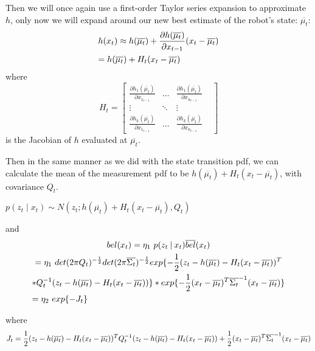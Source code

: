 Then we will once again use a first-order Taylor series expansion to approximate \(h\), only now we will expand around our new best estimate of the robot's state: \(\overline{\mu_t}\):
\begin{multline}
h(x_t) \approx h(\overline{\mu_t}) + \frac{\partial h(\overline{\mu_t})}{\partial x_{t-1}} (x_t - \overline{\mu_t}) \\
= h(\overline{\mu_t}) + H_t (x_t - \overline{\mu_t}) \hfill
\end{multline}
where \[
H_t = \begin{bmatrix} 
\frac{\partial h_1(\overline{\mu_t})}{\partial x_{1_{t-1}}} & \dots & \frac{\partial h_1(\overline{\mu_t})}{\partial x_{n_{t-1}}}\\
\vdots & \ddots & \vdots & \\
\frac{\partial h_k(\overline{\mu_t})}{\partial x_{1_{t-1}}} & \dots & \frac{\partial h_k(\overline{\mu_t})}{\partial x_{n_{t-1}}} 
\end{bmatrix} \] is the Jacobian of \(h\) evaluated at \(\overline{\mu_t}\).

Then in the same manner as we did with the state transition pdf, we can calculate the mean of the measurement pdf to be \(h(\overline{\mu_t}) + H_t (x_t - \overline{\mu_t})\), with covariance \(Q_t\).

\(p(z_t \mathbin{\vert} x_t) \sim N(z_t;h(\overline{\mu_t}) + H_t (x_t - \overline{\mu_t}),Q_t)\)

and 
\begin{multline}
bel(x_t) = \eta_1\ p(z_t \mathbin{\vert} x_t) \overline{bel}(x_t) \\
= \eta_1\ det(2 \pi Q_t)^{-\frac{1}{2}} det(2 \pi \overline{\Sigma_t})^{-\frac{1}{2}} exp\{-\frac{1}{2} (z_t - h(\overline{\mu_t}) - H_t (x_t - \overline{\mu_t}))^T \\ * Q_t^{-1} (z_t - h(\overline{\mu_t}) - H_t (x_t - \overline{\mu_t}))\} * exp \{-\frac{1}{2} (x_t - \overline{\mu_t})^T \overline{\Sigma_t}^{-1} (x_t - \overline{\mu_t}) \} \\
= \eta_2\ exp\{-J_t\} \hfill
\end{multline}

where 
\[
J_t = \frac{1}{2} (z_t - h(\overline{\mu_t}) - H_t (x_t - \overline{\mu_t}))^T Q_t^{-1} (z_t - h(\overline{\mu_t}) - H_t (x_t - \overline{\mu_t})) \\
+ \frac{1}{2} (x_t - \overline{\mu_t})^T \overline{\Sigma_t}^{-1} (x_t - \overline{\mu_t})
\]

